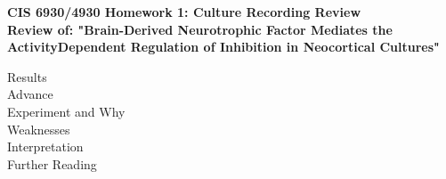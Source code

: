 \documentclass[11pt]{article}
\begin{document}
\begin{center}
{\large {\bf CIS 6930/4930 Homework 1: Culture Recording Review}}\\
{\normalsize {\bf Review of: "Brain-Derived Neurotrophic Factor Mediates the ActivityDependent
Regulation of Inhibition in Neocortical Cultures"}}
\end{center}

Results \\

Advance \\

Experiment and Why \\

Weaknesses \\

Interpretation \\

Further Reading \\
\end{document}
